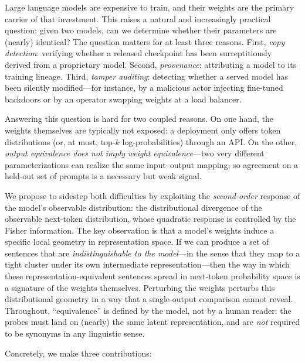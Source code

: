 \documentclass[11pt]{article}
\theoremstyle{definition}
\begin{document}
Large language models are expensive to train, and their weights are the primary
carrier of that investment. This raises a natural and increasingly practical
question: given two models, can we determine whether their parameters are
(nearly) identical? The question matters for at least three reasons. First,
\emph{copy detection}: verifying whether a released checkpoint has been
surreptitiously derived from a proprietary model. Second,
\emph{provenance}: attributing a model to its training lineage. Third,
\emph{tamper auditing}: detecting whether a served model has been silently
modified---for instance, by a malicious actor injecting fine-tuned backdoors or
by an operator swapping weights at a load balancer.

Answering this question is hard for two coupled reasons. On one hand, the
weights themselves are typically not exposed: a deployment only offers token
distributions (or, at most, top-$k$ log-probabilities) through an API. On the
other, \emph{output equivalence does not imply weight equivalence}---two very
different parameterizations can realize the same input--output mapping, so
agreement on a held-out set of prompts is a necessary but weak signal.

We propose to sidestep both difficulties by exploiting the
\emph{second-order} response of the model's observable distribution: the
distributional divergence of the observable next-token distribution, whose
quadratic response is controlled by the Fisher information. The key observation
is that a model's weights induce a specific local geometry in representation
space. If we can produce a set of sentences that are \emph{indistinguishable to
the model}---in the sense that they map to a tight cluster under its own
intermediate representation---then the way in which these
representation-equivalent sentences spread in next-token probability space is a
signature of the weights themselves. Perturbing the weights perturbs this
distributional geometry in a way that a single-output comparison cannot reveal.
Throughout, ``equivalence'' is defined by the model, not by a human reader: the
probes must land on (nearly) the same latent representation, and are
\emph{not} required to be synonyms in any linguistic sense.

Concretely, we make three contributions:
\end{document}
